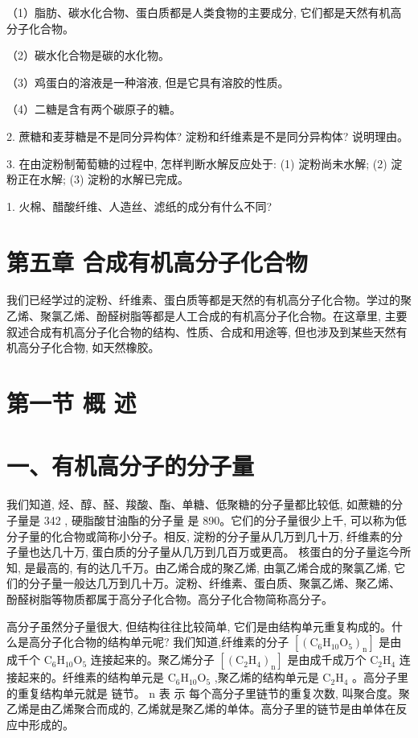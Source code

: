 \documentclass[10pt]{article}
\begin{document}
（1）脂肪、碳水化合物、蛋白质都是人类食物的主要成分, 它们都是天然有机高分子化合物。

（2）碳水化合物是碳的水化物。

（3）鸡蛋白的溶液是一种溶液, 但是它具有溶胶的性质。

（4）二糖是含有两个碳原子的糖。

2. 蔗糖和麦芽糖是不是同分异构体? 淀粉和纤维素是不是同分异构体? 说明理由。

3. 在由淀粉制葡萄糖的过程中, 怎样判断水解反应处于: (1) 淀粉尚未水解; (2) 淀粉正在水解; (3) 淀粉的水解已完成。

1. 火棉、醋酸纤维、人造丝、滤纸的成分有什么不同?

\section*{第五章 合成有机高分子化合物}

我们已经学过的淀粉、纤维素、蛋白质等都是天然的有机高分子化合物。学过的聚乙烯、聚氯乙烯、酚醛树脂等都是人工合成的有机高分子化合物。在这章里, 主要叙述合成有机高分子化合物的结构、性质、合成和用途等, 但也涉及到某些天然有机高分子化合物, 如天然橡胶。

\section*{第一节 概 述}

\section*{一、有机高分子的分子量}

我们知道, 烃、醇、醛、羧酸、酯、单糖、低聚糖的分子量都比较低, 如蔗糖的分子量是 342 , 硬脂酸甘油酯的分子量 是 890。它们的分子量很少上千, 可以称为低分子量的化合物或简称小分子。相反, 淀粉的分子量从几万到几十万, 纤维素的分子量也达几十万, 蛋白质的分子量从几万到几百万或更高。 核蛋白的分子量迄今所知, 是最高的, 有的达几千万。由乙烯合成的聚乙烯, 由氯乙烯合成的聚氯乙烯, 它们的分子量一般达几万到几十万。淀粉、纤维素、蛋白质、聚氯乙烯、聚乙烯、 酚醛树脂等物质都属于高分子化合物。高分子化合物简称高分子。

高分子虽然分子量很大, 但结构往往比较简单, 它们是由结构单元重复构成的。什么是高分子化合物的结构单元呢? 我们知道,纤维素的分子 \(\left\lbrack {\left( {\mathrm{C}}_{6}{\mathrm{H}}_{10}{\mathrm{O}}_{5}\right) }_{\mathrm{n}}\right\rbrack\) 是由成千个 \({\mathrm{C}}_{6}{\mathrm{H}}_{10}{\mathrm{O}}_{5}\) 连接起来的。聚乙烯分子 \(\left\lbrack {\left( {\mathrm{C}}_{2}{\mathrm{H}}_{4}\right) }_{\mathrm{n}}\right\rbrack\) 是由成千成万个 \({\mathrm{C}}_{2}{\mathrm{H}}_{4}\) 连接起来的。纤维素的结构单元是 \({\mathrm{C}}_{6}{\mathrm{H}}_{10}{\mathrm{O}}_{5}\) ,聚乙烯的结构单元是 \({\mathrm{C}}_{2}{\mathrm{H}}_{4}\) 。高分子里的重复结构单元就是 链节。 \(\mathrm{n}\) 表 示 每个高分子里链节的重复次数, 叫聚合度。聚乙烯是由乙烯聚合而成的, 乙烯就是聚乙烯的单体。高分子里的链节是由单体在反应中形成的。
\end{document}
